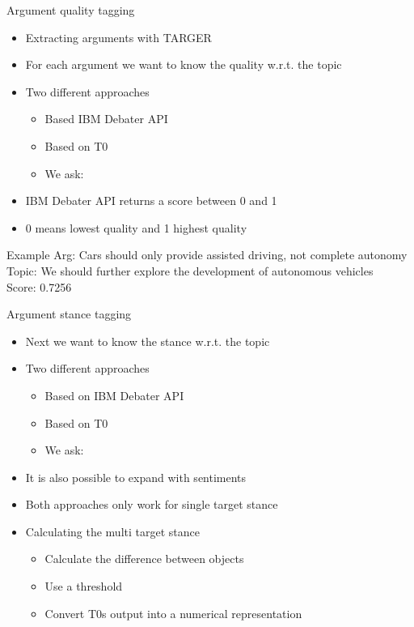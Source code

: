 \documentclass[english]{mlutalk}
\begin{document}
\begin{frame}{Argument quality tagging}
    \begin{itemize}
        \item Extracting arguments with TARGER~\cite{ChernodubOHBHBP2019}
        \item For each argument we want to know the quality w.r.t. the topic
        \item Two different approaches
        \begin{itemize}
            \item Based IBM Debater API~\cite{ToledoG2019}
            \item Based on T0
            \item We ask: 
        \end{itemize}
        \item IBM Debater API returns a score between 0 and 1
        \item 0 means lowest quality and 1 highest quality
    \end{itemize}
    \begin{block}{Example}
        Arg: Cars should only provide assisted driving, not complete autonomy\\
        Topic: We should further explore the development of autonomous vehicles\\ 
        Score: 0.7256
    \end{block}
\end{frame}

\begin{frame}{Argument stance tagging}
    \begin{itemize}
        \item Next we want to know the stance w.r.t. the topic
        \item Two different approaches
        \begin{itemize}
            \item Based on IBM Debater API~\cite{BarHaimBDSS2017}
            \item Based on T0
            \item We ask: 
        \end{itemize}
        \item It is also possible to expand with sentiments
        \item Both approaches only work for single target stance
        \item Calculating the multi target stance
        \begin{itemize}
            \item Calculate the difference between objects
            \item Use a threshold
            \item Convert T0s output into a numerical representation
        \end{itemize}
    \end{itemize}
\end{frame}
\end{document}
